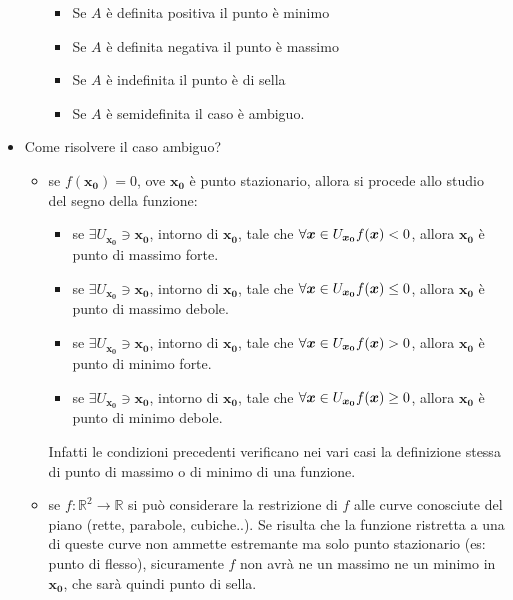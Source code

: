 \documentclass[a4paper,12pt]{book}
\begin{document}
\begin{itemize}
\begin{itemize}
\begin{itemize}
 \item Se $A$ è definita positiva il punto è minimo
 \item Se $A$ è definita negativa il punto è massimo
 \item Se $A$ è indefinita il punto è di sella
 \item Se $A$ è semidefinita il caso è ambiguo.
 \end{itemize}
 
\end{itemize}
\item Come risolvere il caso ambiguo?
\begin{itemize}
\item se $f(\boldsymbol {x_0})=0$, ove $\boldsymbol {x_0}$ è punto stazionario, allora si procede allo studio del segno della funzione:
\begin{itemize}
\item se $\exists U_{\boldsymbol {x_0}}\ni\boldsymbol {x_0}$, intorno di $\boldsymbol {x_0}$, tale che $\forall \boldsymbol{x}\in U_{\boldsymbol {x_0}}\\f(\boldsymbol{x})<0$, allora $\boldsymbol {x_0}$ è punto di massimo forte.
\item se $\exists U_{\boldsymbol {x_0}}\ni\boldsymbol {x_0}$, intorno di $\boldsymbol {x_0}$, tale che $\forall \boldsymbol{x}\in U_{\boldsymbol {x_0}}\\f(\boldsymbol{x})\leq0$, allora $\boldsymbol {x_0}$ è punto di massimo debole.
\item se $\exists U_{\boldsymbol {x_0}}\ni\boldsymbol {x_0}$, intorno di $\boldsymbol {x_0}$, tale che $\forall \boldsymbol{x}\in U_{\boldsymbol {x_0}}\\f(\boldsymbol{x})>0$, allora $\boldsymbol {x_0}$ è punto di minimo forte.
\item se $\exists U_{\boldsymbol {x_0}}\ni\boldsymbol {x_0}$, intorno di $\boldsymbol {x_0}$, tale che $\forall \boldsymbol{x}\in U_{\boldsymbol {x_0}}\\f(\boldsymbol{x})\geq0$, allora $\boldsymbol {x_0}$ è punto di minimo debole.
\end{itemize}
Infatti le condizioni precedenti verificano nei vari casi la definizione stessa di punto di massimo o di minimo di una funzione.
\item se $f:\mathbb{R}^2\to\mathbb{R}$ si può considerare la restrizione di $f$ alle curve conosciute del piano (rette, parabole, cubiche..). Se risulta che la funzione ristretta a una di queste curve non ammette estremante ma solo punto stazionario (es: punto di flesso), sicuramente $f$ non avrà ne un massimo ne un minimo in $\boldsymbol {x_0}$, che sarà quindi punto di sella.

\end{itemize}
\end{itemize}
\end{document}
